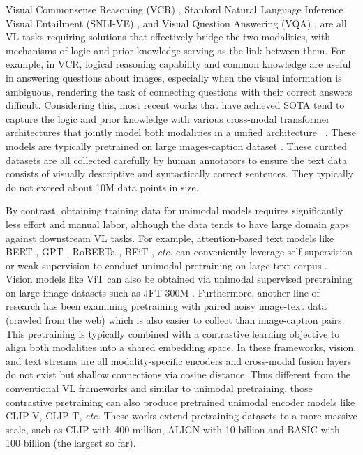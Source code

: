 \documentclass[runningheads]{llncs}
\begin{document}
Visual Commonsense Reasoning (VCR) \cite{zellers2019vcr}, Stanford Natural Language Inference Visual Entailment (SNLI-VE) \cite{xie2019visual}, and Visual Question Answering (VQA) \cite{VQA}, are all VL tasks requiring solutions that effectively bridge the two modalities, with mechanisms of logic and prior knowledge serving as the link between them. For example, in VCR, logical reasoning capability and common knowledge are useful in answering questions about images, especially when the visual information is ambiguous, rendering the task of connecting questions with their correct answers difficult. Considering this, most recent works that have achieved SOTA tend to capture the logic and prior knowledge with various cross-modal transformer architectures that jointly model both modalities in a unified architecture ~\cite{chen2020uniter,Su2020VL-BERT,gan2020large,huang2021seeing,huang2020pixel,lxmert,wang2021sgeitl}. These models are typically pretrained on large images-caption dataset \cite{sharma2018conceptual,lin2014microsoft}. These curated datasets are all collected carefully by human annotators to ensure the text data consists of visually descriptive and syntactically correct sentences. They typically do not exceed about 10M data points in size.



By contrast, obtaining training data for unimodal models requires significantly less effort and manual labor, although the data tends to have large domain gaps against downstream VL tasks. For example, attention-based text models like BERT \cite{devlin2018bert}, GPT \cite{radford2019language}, RoBERTa \cite{roberta}, BEiT \cite{bao2021beit}, \textit{etc.} can conveniently leverage self-supervision or weak-supervision to conduct unimodal pretraining on large text corpus \cite{sharma2018conceptual,lin2014microsoft}. Vision models like ViT \cite{dosovitskiy2020image} can also be obtained via unimodal supervised pretraining on large image datasets such as JFT-300M \cite{sun2017revisiting}. Furthermore, another line of research has been examining pretraining with paired noisy image-text data (crawled from the web) which is also easier to collect than image-caption pairs. This pretraining is typically combined with a contrastive learning objective to align both modalities into a shared embedding space. In these frameworks, vision, and text streams are all modality-specific encoders and cross-modal fusion layers do not exist but shallow connections via cosine distance. Thus different from the conventional VL frameworks and similar to unimodal pretraining, those contrastive pretraining can also produce pretrained unimodal encoder models like CLIP-V, CLIP-T, \textit{etc.} These works extend pretraining datasets to a more massive scale, such as CLIP \cite{clip} with 400 million, ALIGN \cite{jia2021scaling} with 10 billion and BASIC \cite{basic} with 100 billion (the largest so far).
\end{document}
